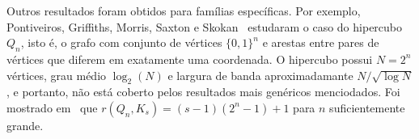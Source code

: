 Outros resultados foram obtidos para famílias específicas. Por exemplo, Pontiveiros, Griffiths, Morris, Saxton e Skokan~\cite{pontiveros2014ramsey} estudaram o caso do hipercubo $Q_n$, isto é, o grafo com conjunto de vértices $\{ 0, 1 \}^n$ e arestas entre pares de vértices que diferem em exatamente uma coordenada. O hipercubo possui $N=2^n$ vértices, grau médio $\log_2(N)$ e largura de banda aproximadamante $N/\sqrt{\log N}$, e portanto, não está coberto pelos resultados mais genéricos menciodados.
Foi mostrado em~\cite{pontiveros2014ramsey} que $r(Q_n, K_s) = (s-1)(2^n -1) + 1$ para $n$ suficientemente grande.




